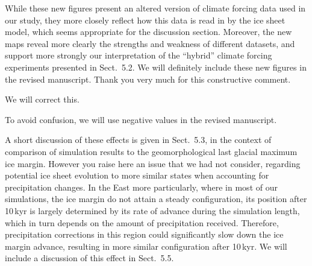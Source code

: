 \documentclass[10pt]{article}
\begin{document}
While these new figures present an altered version of climate forcing data used in our study, they more closely reflect how this data is read in by the ice sheet model, which seems appropriate for the discussion section. Moreover, the new maps reveal more clearly the strengths and weakness of different datasets, and support more strongly our interpretation of the ``hybrid'' climate forcing experiments presented in Sect.~5.2. We will definitely include these new figures in the revised manuscript. Thank you very much for this constructive comment.


We will correct this.


To avoid confusion, we will use negative values in the revised manuscript.


A short discussion of these effects is given in Sect.~5.3, in the context of comparison of simulation results to the geomorphological last glacial maximum ice margin. However you raise here an issue that we had not consider, regarding potential ice sheet evolution to more similar states when accounting for precipitation changes. In the East more particularly, where in most of our simulations, the ice margin do not attain a steady configuration, its position after 10\,kyr is largely determined by its rate of advance during the simulation length, which in turn depends on the amount of precipitation received. Therefore, precipitation corrections in this region could significantly slow down the ice margin advance, resulting in more similar configuration after 10\,kyr. We will include a discussion of this effect in Sect.~5.5.
\end{document}
